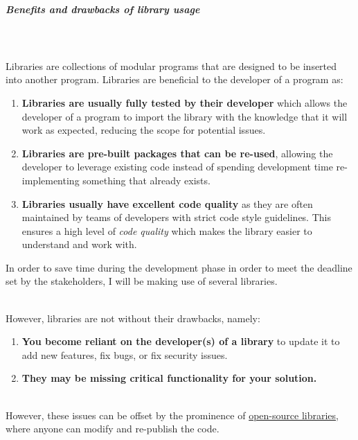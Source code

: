 \documentclass[../../main.tex]{subfiles}
\begin{document}
\subparagraph{Benefits and drawbacks of library usage}

\noindent \\\\ Libraries are collections of modular programs that are
designed to be inserted into another program. Libraries are beneficial
to the developer of a program as:

\begin{enumerate}[label=(\alph*)]
      \item \textbf{Libraries are usually fully tested by their developer}
            which allows the developer of a program to import the library with
            the knowledge that it will work as expected, reducing the scope
            for potential issues.

      \item \textbf{Libraries are pre-built packages that can be re-used},
            allowing the developer to leverage existing code instead of spending
            development time re-implementing something that already exists.

      \item \textbf{Libraries usually have excellent code quality}
            as they are often maintained by teams of developers with strict
            code style guidelines. This ensures a high level of \textit{code quality}
            which makes the library easier to understand and work with.
\end{enumerate}

\noindent In order to save time during the development phase in order to meet
the deadline set by the stakeholders, I will be making use of
several libraries.

\noindent \\ However, libraries are not without their drawbacks, namely:

\begin{enumerate}[label=(\alph*)]
      \item \textbf{You become reliant on the developer(s) of a library}
            to update it to add new features, fix bugs, or fix security issues.

      \item \textbf{They may be missing critical functionality for your solution.}
\end{enumerate}

\noindent \\ However, these issues can be offset by the prominence of
\underline{open-source libraries}, where anyone can modify
and re-publish the code.
\end{document}
